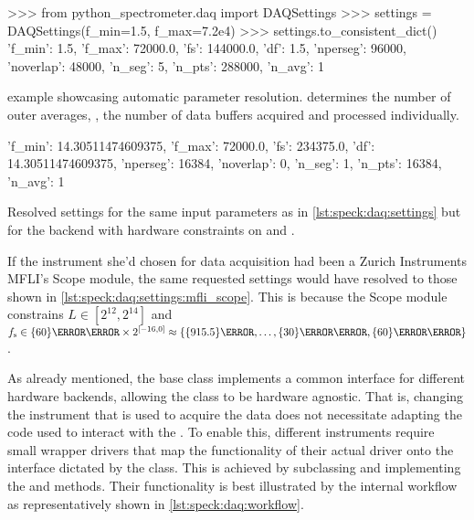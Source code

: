 \begin{listing}[htpb]
    \begin{py}
        >>> from python_spectrometer.daq import DAQSettings
        >>> settings = DAQSettings(f_min=1.5, f_max=7.2e4)
        >>> settings.to_consistent_dict()
        {'f_min': 1.5,
         'f_max': 72000.0,
         'fs': 144000.0,
         'df': 1.5,
         'nperseg': 96000,
         'noverlap': 48000,
         'n_seg': 5,
         'n_pts': 288000,
         'n_avg': 1}
    \end{py}
    \caption{
         example showcasing automatic parameter resolution.
         determines the number of outer averages, \ie, the number of data buffers acquired and processed individually.
    }
    \label{lst:speck:daq:settings}
\end{listing}

\begin{marginlisting}[*-5]
    \begin{py}[fontsize=\footnotesize]
    {'f_min': 14.30511474609375,
     'f_max': 72000.0,
     'fs': 234375.0,
     'df': 14.30511474609375,
     'nperseg': 16384,
     'noverlap': 0,
     'n_seg': 1,
     'n_pts': 16384,
     'n_avg': 1}
    \end{py}
    \caption[Resolved  for MFLI Scope]{
        Resolved settings for the same input parameters as in \cref{lst:speck:daq:settings} but for the  backend with hardware constraints on  and .
    }
    \label{lst:speck:daq:settings:mfli_scope}
\end{marginlisting}

If the instrument she'd chosen for data acquisition had been a Zurich Instruments MFLI's Scope module,
the same requested settings would have resolved to those shown in \cref{lst:speck:daq:settings:mfli_scope}.
This is because the Scope module constrains $L\in[2^{12},2^{14}]$ and $\fs\in\qty{60}{\mega\hertz}\times 2^{[-16, 0]} \approx \allowbreak \lbrace \qty{915.5}{\hertz}, \allowbreak \dotsc, \allowbreak \qty{30}{\mega\hertz}, \qty{60}{\mega\hertz}\rbrace$.

As already mentioned, the  base class implements a common interface for different hardware backends, allowing the  class to be hardware agnostic.
That is, changing the instrument that is used to acquire the data does not necessitate adapting the code used to interact with the .
To enable this, different instruments require small wrapper drivers that map the functionality of their actual driver onto the interface dictated by the  class.
This is achieved by subclassing  and implementing the  and  methods.
Their functionality is best illustrated by the internal workflow as representatively shown in \cref{lst:speck:daq:workflow}.

